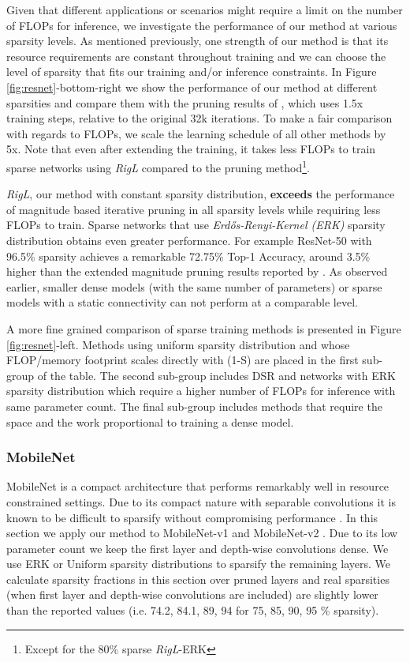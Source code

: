 \documentclass{article}
\begin{document}
Given that different applications or scenarios might require a limit on the number of FLOPs for inference, we investigate the performance of our method at various sparsity levels. As mentioned previously, one strength of our method is that its resource requirements are constant throughout training and we can choose the level of sparsity that fits our training and/or inference constraints. In Figure \ref{fig:resnet}-bottom-right we show the performance of our method at different sparsities and compare them with the pruning results of \cite{gale2019state}, which uses 1.5x training steps, relative to the original 32k iterations. To make a fair comparison with regards to FLOPs, we scale the learning schedule of all other methods by 5x. Note that even after extending the training, it takes less FLOPs to train sparse networks using {\em RigL} compared to the pruning method\footnote{Except for the 80\% sparse {\em RigL}-ERK}.

\textit{RigL}, our method with constant sparsity distribution, \textbf{exceeds} the performance of magnitude based iterative pruning in all sparsity levels while requiring less FLOPs to train. Sparse networks that use \textit{Erdős-Renyi-Kernel (ERK)} sparsity distribution obtains even greater performance. For example ResNet-50 with 96.5\% sparsity achieves a remarkable 72.75\% Top-1 Accuracy, around 3.5\% higher than the extended magnitude pruning results reported by \cite{gale2019state}. As observed earlier, smaller dense models (with the same number of parameters) or sparse models with a static connectivity can not perform at a comparable level.

A more fine grained comparison of sparse training methods is presented in Figure \ref{fig:resnet}-left. Methods using uniform sparsity distribution and whose FLOP/memory footprint scales directly with (1-S) are placed in the first sub-group of the table. The second sub-group includes DSR and networks with ERK sparsity distribution which require a higher number of FLOPs for inference with same parameter count. The final sub-group includes methods that require the space and the work proportional to training a dense model.



\subsubsection{MobileNet}
\label{sec:experiments_mnet}
MobileNet is a compact architecture that performs remarkably well in resource constrained settings. Due to its compact nature with separable convolutions it is known to be difficult to sparsify without compromising performance \citep{gupta2018}. In this section we apply our method to MobileNet-v1 \citep{mobilenetv1} and MobileNet-v2 \citep{mobilenetv2}. Due to its low parameter count we keep the first layer and depth-wise convolutions dense. We use ERK or Uniform sparsity distributions to sparsify the remaining layers. We calculate sparsity fractions in this section over pruned layers and real sparsities (when first layer and depth-wise convolutions are included) are slightly lower than the reported values (i.e. 74.2, 84.1, 89, 94 for 75, 85, 90, 95 \% sparsity).
\end{document}
